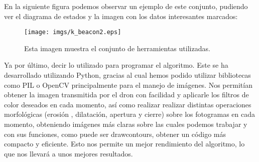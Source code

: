 \documentclass{report}
\begin{document}
En la siguiente figura podemos observar un ejemplo de este conjunto, pudiendo ver el diagrama de estados y la imagen con los datos interesantes marcados:

\begin{figure}[ht]
	\centering
		\texttt{[image: imgs/k\_beacon2.eps]}
		\caption{Esta imagen muestra el conjunto de herramientas utilizadas.}
	\label{fig:Herramientas}
\end{figure}


\hspace{1 cm} Ya por \'ultimo, decir lo utilizado para programar el algoritmo. Este se ha desarrollado utilizando Python, gracias al cual hemos podido utilizar bibliotecas como PIL o OpenCV principalmente para el manejo de im\'agenes. Nos permit\'ian obtener la imagen transmitida por el dron con facilidad y aplicarle los filtros de color deseados en cada momento, as\'i como realizar realizar distintas operaciones morfol\'ogicas (erosi\'on , dilataci\'on, apertura y cierre) sobre los fotogramas en cada momento, obteniendo im\'agenes m\'as claras sobre las cuales podemos trabajar y con sus funciones, como puede ser drawcontours, obtener un c\'odigo m\'as compacto y eficiente. Esto nos permite un mejor rendimiento del algoritmo, lo que nos llevar\'a a unos mejores resultados. 
\end{document}

